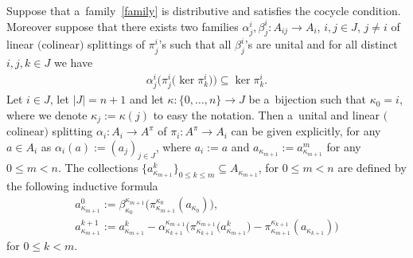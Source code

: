\begin{theorem}
\label{main-split}
Suppose that a~family~\eqref{family} is distributive and satisfies the cocycle condition.
Moreover suppose that there exists two families $\alpha^i_j,\beta^i_j:A_{ij}\rightarrow A_i$, $i,j\in J$,
$j\neq i$ of linear $($colinear$)$ splittings of $\pi^i_j$'s such that all $\beta^i_j$'s are unital and for all distinct
$i,j,k\in J$ we have
\begin{gather}
\label{thkercond}
\alpha^i_j\big(\pi^i_j\big(\ker\pi^i_k\big)\big)\subseteq\ker\pi^i_k.
\end{gather}
Let $i\in J$, let $|J|=n+1$ and let $\kappa:\{0,\ldots,n\}\rightarrow J$ be a~bijection such that $\kappa_0=i$, where we
denote $\kappa_j:=\kappa(j)$ to easy the notation.
Then a~unital and linear $($colinear$)$ splitting $\alpha_i:A_i\rightarrow A^\pi$ of $\pi_i:A^\pi\rightarrow A_i$ can be
given explicitly, for any $a\in A_i$ as $\alpha_i(a):=(a_j)_{j\in J}$, where $a_i:=a$ and
$a_{\kappa_{m+1}}:=a^m_{\kappa_{m+1}}$ for any $0\leq m<n$.
The collections $\{a^k_{\kappa_{m+1}}\}_{0\leq k\leq m}\subseteq A_{\kappa_{m+1}}$, for $0\leq m<n$ are defined by the
following inductive formula
\begin{gather}
a^0_{\kappa_{m+1}}:=\beta^{\kappa_{m+1}}_{\kappa_0}\big(\pi^{\kappa_0}_{\kappa_{m+1}}(a_{\kappa_0})\big),
\nonumber
\\
a^{k+1}_{\kappa_{m+1}}:=a_{\kappa_{m+1}}^k-\alpha^{\kappa_{m+1}}_{\kappa_{k+1}}
\big(\pi^{\kappa_{m+1}}_{\kappa_{k+1}}\big(a^k_{\kappa_{m+1}}\big)-\pi^{\kappa_{k+1}}_{\kappa_{m+1}}(a_{\kappa_{k+1}})\big)
\label{recsplitform}
\end{gather}
for $0\leq k<m$.
\end{theorem}

